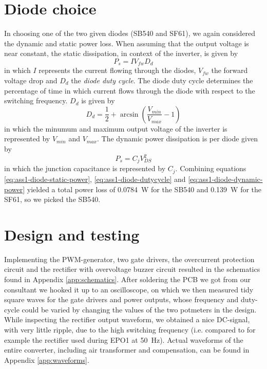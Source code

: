 \documentclass[11pt,titlepage]{report}
\begin{document}
\section{Diode choice}
In choosing one of the two given diodes (SB540 and SF61), we again considered the dynamic and static power loss. When assuming that the output voltage is near constant, the static dissipation, in context of the inverter, is given by
\begin{equation}
\label{eq:ass1-diode-static-power}
	P_s = I V_{fw} D_{d}
\end{equation}
in which $I$ represents the current flowing through the diodes, $V_{fw}$ the forward voltage drop and $D_{d}$ the \textit{diode duty cycle}. The diode duty cycle determines the percentage of time in which current flows through the diode with respect to the switching frequency. $D_{d}$ is given by
\begin{equation}
\label{eq:ass1-diode-dutycycle}
	D_d = \frac{1}{2}+\arcsin{ \left( \frac{V_{min}}{V_{max}}-1 \right) }
\end{equation}
in which the minumum and maximum output voltage of the inverter is represented by $V_{min}$ and $V_{max}$. The dynamic power dissipation is per diode given by
\begin{equation}
\label{eq:ass1-diode-dynamic-power}
	P_s = C_j V_{DS}^2
\end{equation}
in which the junction capacitance is represented by $C_j$. Combining equations \ref{eq:ass1-diode-static-power}, \ref{eq:ass1-diode-dutycycle} and \ref{eq:ass1-diode-dynamic-power} yielded a total power loss of \SI{0.0784}{W} for the SB540 and \SI{0.139}{W} for the SF61, so we picked the SB540. \cite{SB540-datasheet,SF61-datasheet}


\section{Design and testing}
Implementing the PWM-generator, two gate drivers, the overcurrent protection circuit and the rectifier with overvoltage buzzer circuit resulted in the schematics found in Appendix \ref{app:schematics}. %
After soldering the PCB we got from our consultant we hooked it up to an oscilloscope, on which we then measured tidy square waves for the gate drivers and power outputs, whose frequency and duty-cycle could be varied by changing the values of the two potmeters in the design. While inspecting the rectifier output waveform, we obtained a nice DC-signal, with very little ripple, due to the high switching frequency (i.e. compared to for example the rectifier used during EPO1 at \SI{50}{Hz}).
Actual waveforms of the entire converter, including air transformer and compensation, can be found in Appendix \ref{app:waveforms}.
\end{document}

